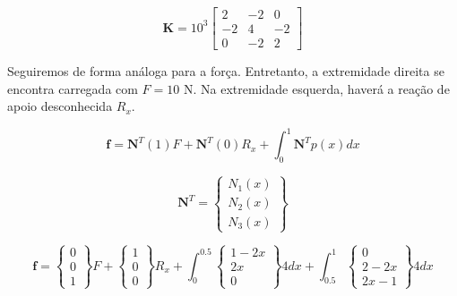         \begin{equation*}
            \mathbf{K} = 
            10^3\begin{bmatrix}
                2 & -2 & 0\\
                -2 & 4 & -2\\
                0 & -2 & 2
            \end{bmatrix}
        \end{equation*}

        Seguiremos de forma análoga para a força. Entretanto, a extremidade direita se encontra carregada com $F = 10$ N. Na extremidade esquerda, haverá a reação de apoio desconhecida $R_x$.

        \begin{equation*}
            \mathbf{f} = \mathbf{N}^T(1) F + \mathbf{N}^T(0) R_x + \int_0^1 \mathbf{N}^T p(x) dx
        \end{equation*}

        \begin{equation*}
            \mathbf{N}^T =
            \begin{Bmatrix}
                N_1(x) \\
                N_2(x) \\
                N_3(x)
            \end{Bmatrix}
        \end{equation*}

        \begin{equation*}
            \mathbf{f} = 
            \begin{Bmatrix}
                0 \\
                0 \\
                1
            \end{Bmatrix} F 
            + \begin{Bmatrix}
                1 \\
                0 \\
                0
            \end{Bmatrix} R_x 
            + \int_{0}^{0.5} 
            \begin{Bmatrix}
                1-2x\\
                2x \\
                0
            \end{Bmatrix} 4 dx 
            + \int_{0.5}^{1}
            \begin{Bmatrix}
                0\\
                2-2x \\
                2x-1
            \end{Bmatrix} 4 dx
        \end{equation*}

